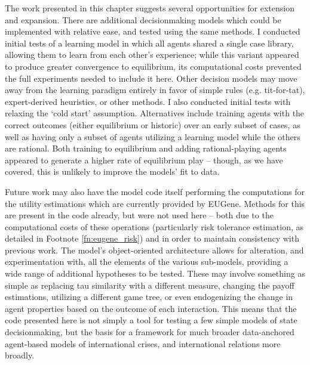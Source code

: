 The work presented in this chapter suggests several opportunities for extension and expansion. There are additional decisionmaking models which could be implemented with relative ease, and tested using the same methods. I conducted initial tests of a learning model in which all agents shared a single case library, allowing them to learn from each other's experience; while this variant appeared to produce greater convergence to equilibrium, its computational costs prevented the full experiments needed to include it here. Other decision models may move away from the learning paradigm entirely in favor of simple rules (e.g. tit-for-tat), expert-derived heuristics, or other methods. I also conducted initial tests with relaxing the `cold start' assumption. Alternatives include training agents with the correct outcomes (either equilibrium or historic) over an early subset of cases, as well as having only a subset of agents utilizing a learning model while the others are rational. Both training to equilibrium and adding rational-playing agents appeared to generate a higher rate of equilibrium play -- though, as we have covered, this is unlikely to improve the models' fit to data.

Future work may also have the model code itself performing the computations for the utility estimations which are currently provided by EUGene. Methods for this are present in the code already, but were not used here -- both due to the computational costs of these operations (particularly risk tolerance estimation, as detailed in Footnote \ref{fn:eugene_risk}) and in order to maintain consistency with previous work. The model's object-oriented architecture allows for alteration, and experimentation with, all the elements of the various sub-models, providing a wide range of additional hypotheses to be tested. These may involve something as simple as replacing tau similarity with a different measure, changing the payoff estimations, utilizing a different game tree, or even endogenizing the change in agent properties based on the outcome of each interaction. This means that the code presented here is not simply a tool for testing a few simple models of state decisionmaking, but the basis for a framework for much broader data-anchored agent-based models of international crises, and international relations more broadly.
